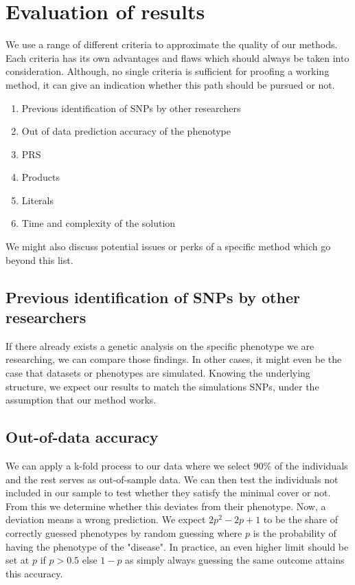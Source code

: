 \documentclass[letterpaper, 11pt]{article}
\begin{document}
\section{Evaluation of results}
\label{sec:evaluate}
We use a range of different criteria to approximate the quality of our methods. Each criteria has its own advantages and flaws which should always be taken into consideration. Although, no single criteria is sufficient for proofing a working method, it can give an indication whether this path should be pursued or not.

\begin{enumerate}
\item Previous identification of SNPs by other researchers
\item Out of data prediction accuracy of the phenotype
\item PRS 
\item Products 
\item Literals
\item Time and complexity of the solution\end{enumerate}

We might also discuss potential issues or perks of a specific method which go beyond this list. 

\subsection{Previous identification of SNPs by other researchers}
If there already exists a genetic analysis on the specific phenotype we are researching, we can compare those findings. 
In other cases, it might even be the case that datasets or phenotypes are simulated. Knowing the underlying structure, we expect our results to match the simulations SNPs, under the assumption that our method works. 
\subsection{Out-of-data accuracy}
We can apply a k-fold process to our data where we select 90\% of the individuals and the rest serves as out-of-sample data. We can then test the individuals not included in our sample to test whether they satisfy the minimal cover or not. From this we determine whether this deviates from their phenotype. Now, a deviation means a wrong prediction. We expect $2p^2-2p+1$ to be the share of correctly guessed phenotypes by random guessing where $p$ is the probability of having the phenotype of the "disease". In practice, an even higher limit should be set at $p$ if $p>0.5$ else $1-p$  as simply always guessing the same outcome attains this accuracy. 
\end{document}
